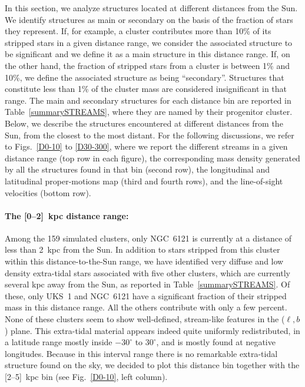     In this section, we analyze structures located at different distances from the Sun. We identify structures as main or secondary on the basis of the fraction of stars they represent. If, for example, a cluster contributes more than 10\% of its stripped stars in a given distance range, we consider the associated structure to be significant and we define it as a main structure in this distance range. If, on the other hand, the fraction of stripped stars from a cluster is between 1\% and 10\%, we define the associated structure as being ``secondary''. Structures that constitute less than 1\% of the cluster mass are considered insignificant in that range. The main and secondary structures for each distance bin are reported in Table~\ref{summarySTREAMS}, where they are named by their progenitor cluster. Below, we describe the structures encountered at different distances from the Sun, from the closest to the most distant. For the following discussions,  we refer to Figs.~\ref{D0-10} to \ref{D30-300}, where we report the different streams in a given distance range (top row in each figure), the corresponding mass density generated by all the structures found in that bin (second row), the longitudinal and latitudinal proper-motions map (third and fourth rows), and the line-of-sight velocities (bottom row).

    \paragraph{The [0--2]~kpc distance range: }
    Among the 159 simulated clusters, only  NGC~6121 is currently at a distance of less than 2~kpc from the Sun. In addition to stars stripped from this cluster within this distance-to-the-Sun range, we have identified very diffuse and low density extra-tidal stars associated with five other clusters, which are currently several kpc away from the Sun, as reported in Table~\ref{summarySTREAMS}. Of these, only UKS~1 and NGC~6121 have a significant fraction of their stripped mass in this distance range. All the others contribute with only a few percent. None of these clusters seem to show well-defined, stream-like features in the ($\ell,b$) plane. This extra-tidal material appears indeed quite uniformly redistributed, in a latitude range mostly inside $-30^\circ$ to $30^\circ$, and is mostly found at negative longitudes. Because in this interval range there is no remarkable extra-tidal structure found on the sky, we decided to plot this distance bin together with the [2--5]~kpc bin (see Fig.~\ref{D0-10}, left column).


